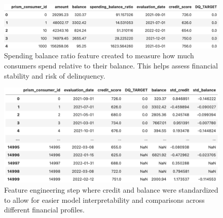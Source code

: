 \documentclass[12pt,letterpaper]{article}
\begin{document}
\begin{figure}[H]
    \centering
    \includegraphics[width=\textwidth]{figure/spending_balance_ratio.png}
    \caption{Spending balance ratio feature created to measure how much consumers spend relative to their balance. This helps assess financial stability and risk of delinquency.}
    \label{fig:spending_balance_ratio}
\end{figure}

\begin{figure}[H]
    \centering
    \includegraphics[width=\textwidth]
    {figure/standardized_credit_balance.png}
    \caption{Feature engineering step where credit and balance were standardized to allow for easier model interpretability and comparisons across different financial profiles.}
    \label{fig:standardized_credit_balance}
\end{figure}
\end{document}
